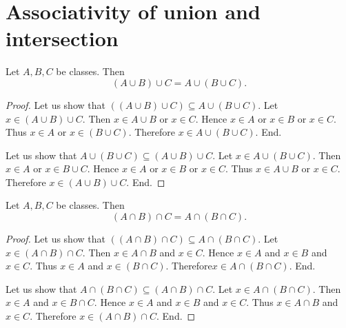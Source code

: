 \documentclass[../../set-theory/set-theory.tex]{subfiles}
\begin{document}
  \section*{Associativity of union and intersection}

  \begin{forthel}
    \begin{proposition}
      Let $A, B, C$ be classes.
      Then \[ (A \cup B) \cup C = A \cup (B \cup C). \]
    \end{proposition}
    \begin{proof}
      Let us show that $((A \cup B) \cup C) \subseteq A \cup (B \cup C)$. %
        Let $x \in (A \cup B) \cup C$.
        Then $x \in A \cup B$ or $x \in C$.
        Hence $x \in A$ or $x \in B$ or $x \in C$.
        Thus $x \in A$ or $x \in (B \cup C)$.
        Therefore $x \in A \cup (B \cup C)$.
      End.

      Let us show that $A \cup (B \cup C) \subseteq (A \cup B) \cup C$.
        Let $x \in A \cup (B \cup C)$.
        Then $x \in A$ or $x \in B \cup C$.
        Hence $x \in A$ or $x \in B$ or $x \in C$.
        Thus $x \in A \cup B$ or $x \in C$.
        Therefore $x \in (A \cup B) \cup C$.
      End.
    \end{proof}
  \end{forthel}

  \begin{forthel}
    \begin{proposition}
      Let $A, B, C$ be classes.
      Then \[ (A \cap B) \cap C = A \cap (B \cap C). \]
    \end{proposition}
    \begin{proof}
      Let us show that $((A \cap B) \cap C) \subseteq A \cap (B \cap C)$. %
        Let $x \in (A \cap B) \cap C$.
        Then $x \in A \cap B$ and $x \in C$.
        Hence $x \in A$ and $x \in B$ and $x \in C$.
        Thus $x \in A$ and $x \in (B \cap C)$.
        Therefore$ x \in A \cap (B \cap C)$.
      End.

      Let us show that $A \cap (B \cap C) \subseteq (A \cap B) \cap C$.
        Let $x \in A \cap (B \cap C)$.
        Then $x \in A$ and $x \in B \cap C$.
        Hence $x \in A$ and $x \in B$ and $x \in C$.
        Thus $x \in A \cap B$ and $x \in C$.
        Therefore $x \in (A \cap B) \cap C$.
      End.
    \end{proof}
  \end{forthel}
\end{document}
